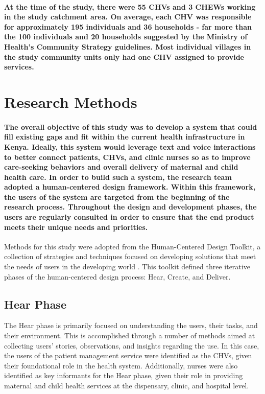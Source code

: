 \paragraph{At the time of the study, there were 55 CHVs and 3 CHEWs working in the study catchment area. On average, each CHV was responsible for approximately 195 individuals and 36 households - far more than the 100 individuals and 20 households suggested by the Ministry of Health's Community Strategy guidelines. Most individual villages in the study community units only had one CHV assigned to provide services.}


\section{Research Methods}

\paragraph{The overall objective of this study was to develop a system that could fill existing gaps and fit within the current health infrastructure in Kenya. Ideally, this system would leverage text and voice interactions to better connect patients, CHVs, and clinic nurses so as to improve care-seeking behaviors and overall delivery of maternal and child health care. In order to build such a system, the research team adopted a human-centered design framework. Within this framework, the users of the system are targeted from the beginning of the research process. Throughout the design and development phases, the users are regularly consulted in order to ensure that the end product meets their unique needs and priorities.}

Methods for this study were adopted from the Human-Centered Design Toolkit, a collection of strategies and techniques focused on developing solutions that meet the needs of users in the developing world \citep{HCDToolkit}. This toolkit defined three iterative phases of the human-centered design process: Hear, Create, and Deliver. 

\subsection{Hear Phase}
The Hear phase is primarily focused on understanding the users, their tasks, and their environment. This is accomplished through a number of methods aimed at collecting users' stories, observations, and insights regarding the use. In this case, the users of the patient management service were identified as the CHVs, given their foundational role in the health system. Additionally, nurses were also identified as key informants for the Hear phase, given their role in providing maternal and child health services at the dispensary, clinic, and hospital level. 

